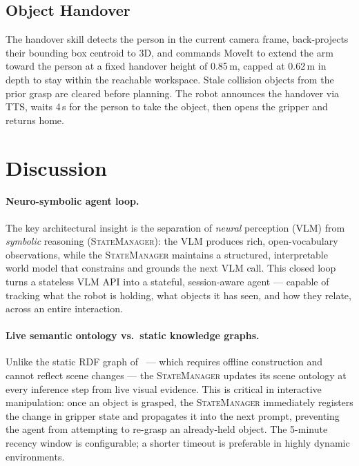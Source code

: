 \documentclass[twocolumn,10pt]{article}
\newcommand{\SM}{\textsc{StateManager}}
\begin{document}
\subsection{Object Handover}
\label{sec:handover}

The handover skill detects the person in the current camera frame,
back-projects their bounding box centroid to 3D, and commands MoveIt to
extend the arm toward the person at a fixed handover height of 0.85\,m,
capped at 0.62\,m in depth to stay within the reachable workspace.
Stale collision objects from the prior grasp are cleared before planning.
The robot announces the handover via TTS, waits 4\,s for the person to
take the object, then opens the gripper and returns home.


\section{Discussion}
\label{sec:discussion}

\paragraph{Neuro-symbolic agent loop.}
The key architectural insight is the separation of \textit{neural} perception
(VLM) from \textit{symbolic} reasoning (\SM): the VLM produces rich,
open-vocabulary observations, while the \SM{} maintains a structured,
interpretable world model that constrains and grounds the next VLM call.
This closed loop turns a stateless VLM API into a stateful, session-aware
agent — capable of tracking what the robot is holding, what objects it has
seen, and how they relate, across an entire interaction.

\paragraph{Live semantic ontology vs.\ static knowledge graphs.}
Unlike the static RDF graph of~\cite{eladdachi2025llm} — which requires
offline construction and cannot reflect scene changes — the \SM{} updates
its scene ontology at every inference step from live visual evidence.
This is critical in interactive manipulation: once an object is grasped,
the \SM{} immediately registers the change in gripper state and
propagates it into the next prompt, preventing the agent from attempting
to re-grasp an already-held object.
The 5-minute recency window is configurable; a shorter timeout is preferable
in highly dynamic environments.
\end{document}
